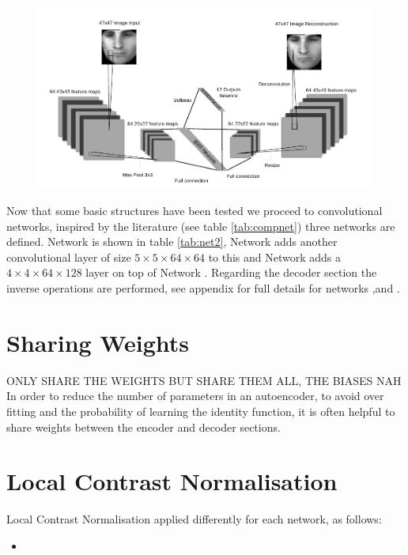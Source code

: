     \begin{figure}[h!]
     \centering
     \includegraphics[width=\textwidth]{illustrations/aec_network.pdf}
    \end{figure}

    Now that some basic structures have been tested we proceed to convolutional networks,
    inspired by the literature (see table \ref{tab:compnet}) three networks are defined.
    Network \networkII is shown in table \ref{tab:net2}, Network \networkII
    adds another convolutional layer of size $5\times 5 \times 64 \times 64$ to this and
    Network \networkIV adds a $4\times 4 \times 64 \times 128$ layer
    on top of Network \networkII. Regarding the decoder section the inverse operations are
    performed, see appendix \label{appendix1} for full details
    for networks \networkII,\networkII and \networkIV.

    

  \section{Sharing Weights}
    ONLY SHARE THE WEIGHTS BUT SHARE THEM ALL, THE BIASES NAH
    In order to reduce the number of parameters in an autoencoder, to avoid over fitting
    and the probability of learning the identity function, it is often helpful to share weights
    between the encoder and decoder sections.
  \section{Local Contrast Normalisation}
    Local Contrast Normalisation applied differently for each network, as follows:
    \begin{itemize}
      \item
    \end{itemize}
